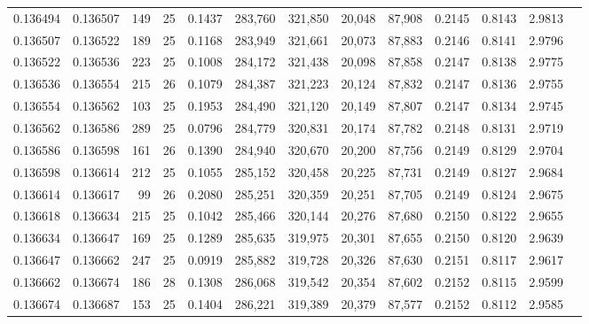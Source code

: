 \begin{tabular}{rrrrrrrrrrrrr}
0.136494 & 0.136507 &   149 &  25 &                                     0.1437 & 283,760 & 321,850 &  20,048 &  87,908 & 0.2145 & 0.8143 & 2.9813 \\
0.136507 & 0.136522 &   189 &  25 &                                     0.1168 & 283,949 & 321,661 &  20,073 &  87,883 & 0.2146 & 0.8141 & 2.9796 \\
0.136522 & 0.136536 &   223 &  25 &                                     0.1008 & 284,172 & 321,438 &  20,098 &  87,858 & 0.2147 & 0.8138 & 2.9775 \\
0.136536 & 0.136554 &   215 &  26 &                                     0.1079 & 284,387 & 321,223 &  20,124 &  87,832 & 0.2147 & 0.8136 & 2.9755 \\
0.136554 & 0.136562 &   103 &  25 &                                     0.1953 & 284,490 & 321,120 &  20,149 &  87,807 & 0.2147 & 0.8134 & 2.9745 \\
0.136562 & 0.136586 &   289 &  25 &                                     0.0796 & 284,779 & 320,831 &  20,174 &  87,782 & 0.2148 & 0.8131 & 2.9719 \\
0.136586 & 0.136598 &   161 &  26 &                                     0.1390 & 284,940 & 320,670 &  20,200 &  87,756 & 0.2149 & 0.8129 & 2.9704 \\
0.136598 & 0.136614 &   212 &  25 &                                     0.1055 & 285,152 & 320,458 &  20,225 &  87,731 & 0.2149 & 0.8127 & 2.9684 \\
0.136614 & 0.136617 &    99 &  26 &                                     0.2080 & 285,251 & 320,359 &  20,251 &  87,705 & 0.2149 & 0.8124 & 2.9675 \\
0.136618 & 0.136634 &   215 &  25 &                                     0.1042 & 285,466 & 320,144 &  20,276 &  87,680 & 0.2150 & 0.8122 & 2.9655 \\
0.136634 & 0.136647 &   169 &  25 &                                     0.1289 & 285,635 & 319,975 &  20,301 &  87,655 & 0.2150 & 0.8120 & 2.9639 \\
0.136647 & 0.136662 &   247 &  25 &                                     0.0919 & 285,882 & 319,728 &  20,326 &  87,630 & 0.2151 & 0.8117 & 2.9617 \\
0.136662 & 0.136674 &   186 &  28 &                                     0.1308 & 286,068 & 319,542 &  20,354 &  87,602 & 0.2152 & 0.8115 & 2.9599 \\
0.136674 & 0.136687 &   153 &  25 &                                     0.1404 & 286,221 & 319,389 &  20,379 &  87,577 & 0.2152 & 0.8112 & 2.9585 \\

\end{tabular}
